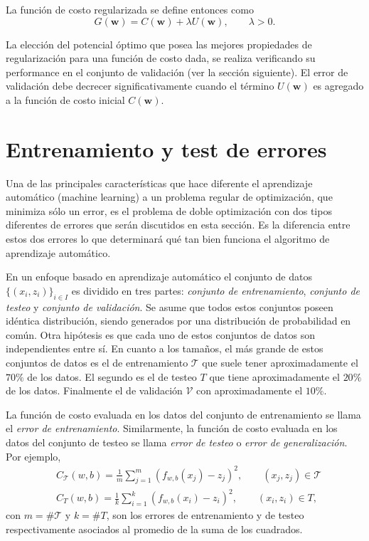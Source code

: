 \documentclass[12pt, a4paper]{amsbook}
\newcommand{\Tc}{{\mathcal T}}
\newcommand{\Vc}{{\mathcal V}}
\newcommand{\ww}{{\mathbf w}}
\theoremstyle{remark}
\theoremstyle{definition}
\numberwithin{section}{chapter}
\numberwithin{subsection}{section}
\numberwithin{equation}{section}
\numberwithin{figure}{chapter}
\begin{document}
La función de costo regularizada se define entonces como
$$
G(\ww) = C(\ww) + \lambda U(\ww),\qquad \lambda>0.
$$

La elección del potencial óptimo que posea las mejores propiedades de regularización para una función de costo dada, se realiza verificando su performance en el conjunto de validación (ver la sección siguiente). El error de validación debe decrecer significativamente cuando el término $U(\ww)$ es agregado a la función de costo inicial $C(\ww)$.

\section{Entrenamiento y test de errores}\label{sec.c3.4}

Una de las principales características que hace diferente el aprendizaje automático (machine learning) a un problema regular de optimización, que minimiza sólo un error, es el problema de doble optimización con dos tipos diferentes de errores que serán discutidos en esta sección. Es la diferencia entre estos dos errores lo que determinará qué tan bien funciona el algoritmo de aprendizaje automático.

En un enfoque basado en aprendizaje automático el conjunto de datos $\{(x_i, z_i)\}_{i\in I}$ es dividido en tres partes: {\em conjunto de entrenamiento}, {\em conjunto de testeo} y {\em conjunto de validación}. Se asume que todos estos conjuntos poseen idéntica distribución, siendo generados por una distribución de probabilidad en común. Otra hipótesis es que cada uno de estos conjuntos de datos son independientes entre sí. En cuanto a los tamaños, el más grande de estos conjuntos de datos es el de entrenamiento $\Tc$ que suele tener aproximadamente el $70\%$ de los datos. El segundo es el de testeo $T$ que tiene aproximadamente el $20\%$ de los datos. Finalmente el de validación $\Vc$ con aproximadamente el $10\%$.

La función de costo evaluada en los datos del conjunto de entrenamiento se llama el {\em error de entrenamiento}. Similarmente, la función de costo evaluada en los datos del conjunto de testeo se llama {\em error de testeo} o {\em error de generalización}. Por ejemplo,
\begin{align*}
& C_{\Tc}(w, b) = \frac{1}{m}\sum_{j=1}^m (f_{w, b}(x_j)-z_j)^2,\qquad (x_j, z_j)\in \Tc\\
& C_T(w, b) = \frac{1}{k}\sum_{i=1}^k (f_{w, b}(x_i)-z_i)^2,\qquad (x_i, z_i)\in T,
\end{align*}
con $m=\#\Tc$ y $k=\# T$, son los errores de entrenamiento y de testeo respectivamente asociados al promedio de la suma de los cuadrados.
\end{document}
